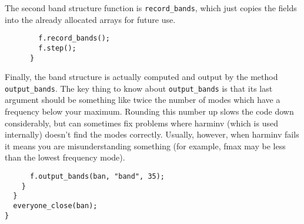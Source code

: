 The second band structure function is \verb-record_bands-, which just
copies the fields into the already allocated arrays for future use.

\begin{verbatim}
        f.record_bands();
        f.step();
      }
\end{verbatim}

Finally, the band structure is actually computed and output by the method
\verb-output_bands-.  The key thing to know about
\verb-output_bands- is that its last argument should be something like
twice the number of modes which have a frequency below your maximum.
Rounding this number up slows the code down considerably, but can sometimes
fix problems where harminv (which is used internally) doesn't find the
modes correctly.  Usually, however, when harminv fails it means you are
misunderstanding something (for example, fmax may be less than the lowest
frequency mode).

\begin{verbatim}
      f.output_bands(ban, "band", 35);
    }
  }
  everyone_close(ban);
}
\end{verbatim}